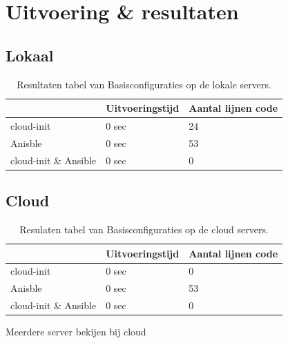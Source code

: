 \section{Uitvoering \& resultaten}

\subsection{Lokaal}

\begin{table}[!htb]
	\centering
	\begin{tabular}{| l | l | l |}
		\hline
		& \textbf{Uitvoeringstijd} & \textbf{Aantal lijnen code}  \\ \hline
		cloud-init & 0 sec & 24 \\ \hline
		Anisble & 0 sec & 53 \\ \hline
		cloud-init \& Ansible & 0 sec & 0 \\
		\hline
	\end{tabular}
	\caption{Resultaten tabel van Basisconfiguraties op de lokale servers.}
	\label{tab:tabel lokale resultaten basis}
\end{table}



\subsection{Cloud}

\begin{table}[!htb]
	\centering
	\begin{tabular}{| l | l | l |}
		\hline
		& \textbf{Uitvoeringstijd} & \textbf{Aantal lijnen code}  \\ \hline
		cloud-init & 0 sec & 0 \\ \hline
		Anisble & 0 sec & 53 \\ \hline
		cloud-init \& Ansible & 0 sec & 0 \\
		\hline
	\end{tabular}
	\caption{Resulaten tabel van Basisconfiguraties op de cloud servers.}
	\label{tab:tabel cloud resultaten basis}
\end{table}

Meerdere server bekijen bij cloud
